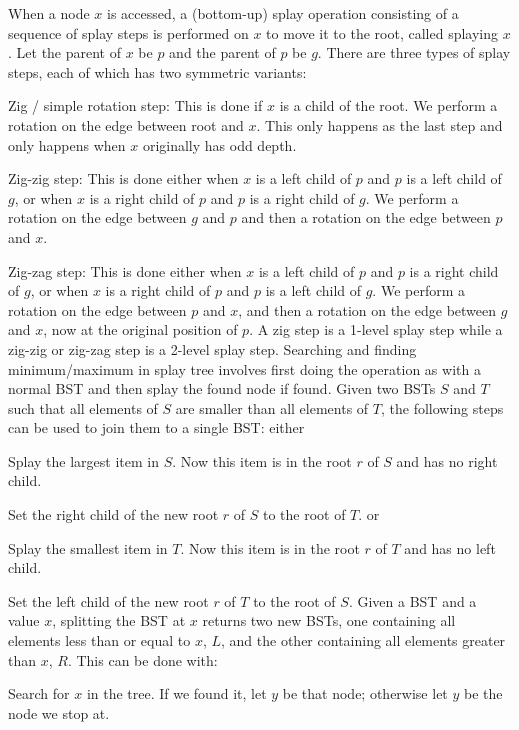 \documentclass[a4paper,12pt]{article}
\begin{document}
When a node $x$ is accessed, a (bottom-up) splay operation consisting of a sequence of splay steps is performed on $x$ to move it to the root, called splaying $x$. Let the parent of $x$ be $p$ and the parent of $p$ be $g$. There are three types of splay steps, each of which has two symmetric variants:
\bit
\item Zig / simple rotation step: This is done if $x$ is a child of the root. We perform a rotation on the edge between root and $x$. This only happens as the last step and only happens when $x$ originally has odd depth.
\item Zig-zig step: This is done either when $x$ is a left child of $p$ and $p$ is a left child of $g$, or when $x$ is a right child of $p$ and $p$ is a right child of $g$. We perform a rotation on the edge between $g$ and $p$ and then a rotation on the edge between $p$ and $x$.
\item Zig-zag step: This is done either when $x$ is a left child of $p$ and $p$ is a right child of $g$, or when $x$ is a right child of $p$ and $p$ is a left child of $g$. We perform a rotation on the edge between $p$ and $x$, and then a rotation on the edge between $g$ and $x$, now at the original position of $p$.
\eit
A zig step is a 1-level splay step while a zig-zig or zig-zag step is a 2-level splay step.
Searching and finding minimum/maximum in splay tree involves first doing the operation as with a normal BST and then splay the found node if found.
Given two BSTs $S$ and $T$ such that all elements of $S$ are smaller than all elements of $T$, the following steps can be used to join them to a single BST: either
\ben
\item Splay the largest item in $S$. Now this item is in the root $r$ of $S$ and has no right child.
\item Set the right child of the new root $r$ of $S$ to the root of $T$.
\een
or
\ben
\item Splay the smallest item in $T$. Now this item is in the root $r$ of $T$ and has no left child.
\item Set the left child of the new root $r$ of $T$ to the root of $S$.
\een
{}
Given a BST and a value $x$, splitting the BST at $x$ returns two new BSTs, one containing all elements less than or equal to $x$, $L$, and the other containing all elements greater than $x$, $R$. This can be done with:
\ben
\item Search for $x$ in the tree. If we found it, let $y$ be that node; otherwise let $y$ be the node we stop at.
\end{document}
